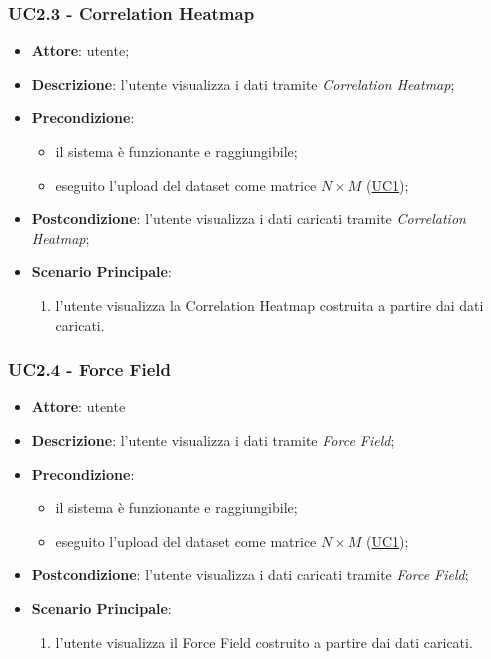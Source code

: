     \subsubsection{UC2.3 - Correlation Heatmap}
    \label{uc2.3}
    
    \begin{itemize}
    \item \textbf{Attore}: utente;
    \item \textbf{Descrizione}: l'utente visualizza i dati tramite \emph{Correlation Heatmap};
    \item \textbf{Precondizione}:
    \begin{itemize}
        \item il sistema è funzionante e raggiungibile;
        \item eseguito l'upload del dataset come matrice $N\times M$ (\hyperref[uc1]{UC1});
    \end{itemize}
    \item \textbf{Postcondizione}: l'utente visualizza i dati caricati tramite \emph{Correlation Heatmap};
    \item \textbf{Scenario Principale}: 
        \begin{enumerate}
            \item l'utente visualizza la Correlation Heatmap costruita a partire dai dati caricati.
        \end{enumerate}
    \end{itemize}
    
    \subsubsection{UC2.4 - Force Field}
    \label{uc2.4}
    
    \begin{itemize}
    \item \textbf{Attore}: utente
    \item \textbf{Descrizione}: l'utente visualizza i dati tramite \emph{Force Field};
    \item \textbf{Precondizione}:
    \begin{itemize}
        \item il sistema è funzionante e raggiungibile;
       \item eseguito l'upload del dataset come matrice $N\times M$ (\hyperref[uc1]{UC1});
    \end{itemize}
    \item \textbf{Postcondizione}: l'utente visualizza i dati caricati tramite \emph{Force Field};
    \item \textbf{Scenario Principale}: 
        \begin{enumerate}
            \item l'utente visualizza il Force Field costruito a partire dai dati caricati.
        \end{enumerate}
    \end{itemize}
    
